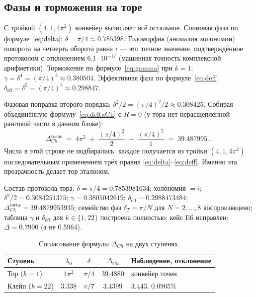 \subsection{Фазы и торможения на торе}

С тройкой $(4,1,4\pi^2)$ конвейер вычисляет всё остальное. Спиновая
фаза по формуле~\eqref{eq:delta}: $\delta=\pi/4\approx0.785398$.
Голоморфия (аномалия холономии) поворота на четверть оборота равна
$i$ — это точное значение, подтверждённое протоколом с отклонением
$6.1\cdot10^{-17}$ (машинная точность комплексной арифметики). Торможение
по формуле~\eqref{eq:gamma} при $k=1$:
$\gamma=\delta^4=(\pi/4)^4\approx0.380504$. Эффективная фаза по
формуле~\eqref{eq:deff}: $\delta_{\mathrm{eff}}=\delta^5=(\pi/4)^5
\approx0.298847$.

Фазовая поправка второго порядка: $\delta^2/2=(\pi/4)^2/2
\approx0.308425$. Собирая объединённую формулу~\eqref{eq:deltaCh} с
$R=0$ (у тора нет нерасщеплённой ранговой части в данном блоке):
\[
  \Delta_{Ch}^{\mathrm{torus}}
  \;=\; 4\pi^2 \;+\; \frac{(\pi/4)^2}{2} \;-\; \frac{(\pi/4)^5}{1}
  \;=\; 39.487995\ldots
\]
Числа в этой строке не подбирались: каждое получается из тройки
$(4,1,4\pi^2)$ последовательным применением трёх правил
\eqref{eq:delta}--\eqref{eq:deff}. Именно эта прозрачность делает тор
эталоном.

\begin{databox}
Состав протокола тора: $\delta=\pi/4=0.7853981634$; холономия $=i$;
$\delta^2/2=0.3084251375$; $\gamma=0.3805042619$;
$\delta_{\mathrm{eff}}=0.2988473484$;
$\Delta_{Ch}^{\mathrm{torus}}=39.4879953935$; семейство фаз
$\delta_T=\pi/N$ для $N=2,\dots,8$ воспроизведено; таблица
$\gamma$ и $\delta_{\mathrm{eff}}$ для $k\in\{1,22\}$ построена
полностью; кейс E6 исправлен: $\Delta=0.7990$ (а не $0.5964$).
\end{databox}

\begin{table}[t]
\centering
\caption{Согласование формулы $\Delta_{Ch}$ на двух ступенях.}
\label{tab:torus-triples}
\small
\begin{tabularx}{\textwidth}{@{}l c c c >{\raggedright\arraybackslash}X@{}}
\toprule
Ступень & $\lambda_0$ & $\delta$ & $\Delta_{Ch}$ & Наблюдение, отклонение \\
\midrule
Тор ($k=1$) & $4\pi^2$ & $\pi/4$ & $39.4880$ & конвейер точен \\
Клейн ($k=22$) & $3.338$ & $\pi/7$ & $3.4399$ & $3.443$; $0.0905\%$ \\
\bottomrule
\end{tabularx}
\end{table}

